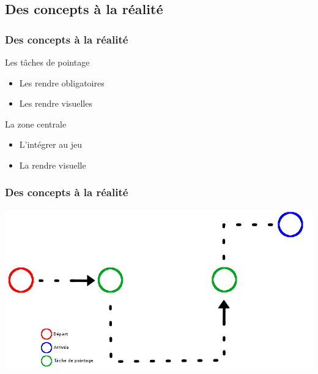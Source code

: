 \documentclass{beamer}
\begin{document}
\subsection{Des concepts à la réalité}
\begin{frame}
\frametitle{Des concepts à la réalité}

\begin{block}{Les tâches de pointage}
\begin{itemize}
\item Les rendre obligatoires
\item Les rendre visuelles
\end{itemize}
\end{block}

\begin{block}{La zone centrale}
\begin{itemize}
\item L'intégrer au jeu
\item La rendre visuelle
\end{itemize}
\end{block}

\end{frame}

\begin{frame}
\frametitle{Des concepts à la réalité}

\begin{center}
\includegraphics[scale=0.4]{images/path.png}
\end{center}
\end{frame}
\end{document}
